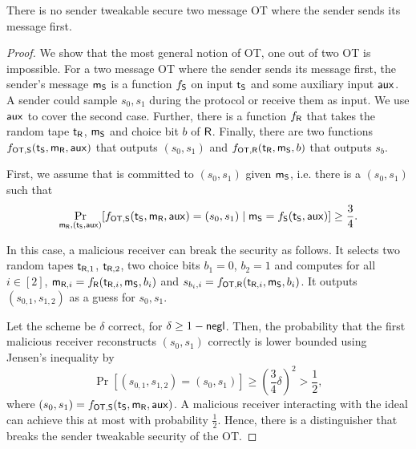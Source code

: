 \begin{lemma}\label{lem:nosendtweak}
There is no sender tweakable secure two message OT where the sender sends its message first. 
\end{lemma}



\begin{proof}
We show that the most general notion of OT, one out of two OT is impossible.  
For a two message OT where the sender sends its message first, the sender's message $\mathsf{m}_{\mathsf{S}}$ is a function $f_{\mathsf{S}}$ on input $\mathsf{t}_{\mathsf{S}}$ and some auxiliary input $\mathsf{aux}$. A sender could sample $s_0,s_1$ during the protocol or receive them as input. We use $\mathsf{aux}$ to cover the second case. Further, there is a function $f_{\mathsf{R}}$ that takes the random tape $\mathsf{t}_{\mathsf{R}}$, $\mathsf{m}_{\mathsf{S}}$ and choice bit $b$ of $\mathsf{R}$. Finally, there are two functions $f_{\mathsf{OT},\mathsf{S}}(\mathsf{t}_{\mathsf{S}},\mathsf{m}_{\mathsf{R}},\mathsf{aux})$ that outputs $(s_0,s_1)$ and $f_{\mathsf{OT},\mathsf{R}}(\mathsf{t}_{\mathsf{R}},\mathsf{m}_{\mathsf{S}},b)$ that outputs $s_b$. 

First, we assume that \send is committed to $(s_0,s_1)$ given $\mathsf{m}_{\mathsf{S}}$, i.e. there is a $(s_0,s_1)$ such that
$$
\Pr_{\mathsf{m}_{\mathsf{R}}, (\mathsf{t}_{\mathsf{S}},\mathsf{aux})}[f_{\mathsf{OT},\mathsf{S}}(\mathsf{t}_{\mathsf{S}},\mathsf{m}_{\mathsf{R}},\mathsf{aux})=(s_0,s_1)\mid \mathsf{m}_{\mathsf{S}}=f_{\mathsf{S}}(\mathsf{t}_{\mathsf{S}},\mathsf{aux})]\geq\frac{3}{4}.
$$

In this case, a malicious receiver can break the security as follows. It selects two random tapes $\mathsf{t}_{\mathsf{R},1}$, $\mathsf{t}_{\mathsf{R},2}$, two choice bits $b_1=0$, $b_2=1$ and computes for all $i\in[2]$, $\mathsf{m}_{\mathsf{R},i}= f_{\mathsf{R}}(\mathsf{t}_{\mathsf{R},i},\mathsf{m}_{\mathsf{S}},b_i)$ and $s_{b_{i},i}=f_{\mathsf{OT},\mathsf{R}}(\mathsf{t}_{\mathsf{R},i},\mathsf{m}_{\mathsf{S}},b_i)$. It outputs $(s_{0,1},s_{1,2})$ as a guess for $s_0,s_1$.

Let the scheme be $\delta$ correct, for $\delta\geq 1-\mathsf{negl}$. Then, the probability that the first malicious receiver reconstructs $(s_0,s_1)$ correctly is lower bounded using Jensen's inequality by
$$
\Pr[(s_{0,1},s_{1,2})=(s_0,s_1)]\geq \left(\frac{3}{4}\delta\right)^2> \frac{1}{2},
$$
where $(s_0,s_1)=f_{\mathsf{OT},\mathsf{S}}(\mathsf{t}_{\mathsf{S}},\mathsf{m}_{\mathsf{R}},\mathsf{aux})$. A malicious receiver interacting with the ideal \OT can achieve this at most with probability $\frac{1}{2}$. Hence, there is a distinguisher that breaks the sender tweakable security of the OT.


\end{proof}

